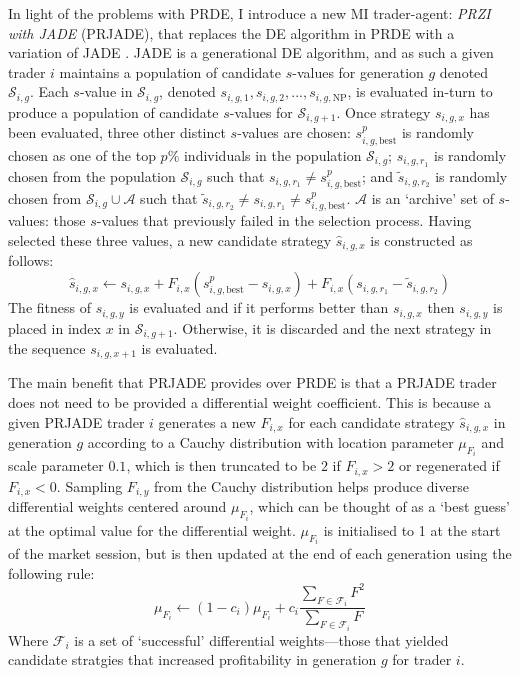 \documentclass[conference]{IEEEtran}
\begin{document}
In light of the problems with PRDE, I introduce a new MI trader-agent: \textit{PRZI with JADE} (PRJADE), that replaces the DE algorithm in PRDE with a variation of JADE \cite{ZhangSanderson}.
JADE is a generational DE algorithm, and as such a given trader $i$ maintains a population of candidate $s$-values for generation $g$ denoted $\mathcal{S}_{i,g}$.
Each $s$-value in $\mathcal{S}_{i,g}$, denoted $s_{i,g,1}, s_{i,g,2}, ..., s_{i,g,\mathrm{NP}}$, is evaluated in-turn to produce a population of candidate $s$-values for $\mathcal{S}_{i,g+1}$.
Once strategy $s_{i,g,x}$ has been evaluated, three other distinct $s$-values are chosen: $s^p_{i,g,\text{best}}$ is randomly chosen as one of the top $p\%$ individuals in the population $\mathcal{S}_{i,g}$; $s_{i,g,r_1}$ is randomly chosen from the population $\mathcal{S}_{i,g}$ such that $s_{i,g,r_1}\ne s^p_{i,g,\text{best}}$; and $\tilde{s}_{i,g,r_2}$ is randomly chosen from $\mathcal{S}_{i,g}\cup\mathcal{A}$ such that $\tilde{s}_{i,g,r_2}\ne s_{i,g,r_1}\ne s^p_{i,g,\text{best}}$.
$\mathcal{A}$ is an `archive' set of $s$-values: those $s$-values that previously failed in the selection process.
Having selected these three values, a new candidate strategy $\hat{s}_{i,g,x}$ is constructed as follows:
\[
    \hat{s}_{i,g,x}\leftarrow s_{i,g,x}+F_{i,x}\left(s^p_{i,g,\text{best}} - s_{i,g,x}\right) + F_{i,x}\left(s_{i,g,r_1} - \tilde{s}_{i,g,r_2}\right)
\]
The fitness of $s_{i,g,y}$ is evaluated and if it performs better than $s_{i,g,x}$ then $s_{i,g,y}$ is placed in index $x$ in $\mathcal{S}_{i,g+1}$. Otherwise, it is discarded and the next strategy in the sequence $s_{i,g,x+1}$ is evaluated.

The main benefit that PRJADE provides over PRDE is that a PRJADE trader does not need to be provided a differential weight coefficient.
This is because a given PRJADE trader $i$ generates a new $F_{i,x}$ for each candidate strategy $\hat{s}_{i,g,x}$ in generation $g$ according to a Cauchy distribution with location parameter $\mu_{F_i}$ and scale parameter $0.1$, which is then truncated to be $2$ if $F_{i,x}>2$ or regenerated if $F_{i,x}<0$.
Sampling $F_{i,y}$ from the Cauchy distribution helps produce diverse differential weights centered around $\mu_{F_i}$, which can be thought of as a `best guess' at the optimal value for the differential weight.
$\mu_{F_i}$ is initialised to 1 at the start of the market session, but is then updated at the end of each generation using the following rule:
\[
    \mu_{F_i}\leftarrow (1-c_i)\mu_{F_i} + c_i\frac{\sum_{F\in \mathcal{F}_i} F^2}{\sum_{F\in\mathcal{F}_i} F}
\]
Where $\mathcal{F}_i$ is a set of `successful' differential weights---those that yielded candidate stratgies that increased profitability in generation $g$ for trader $i$.
\end{document}
